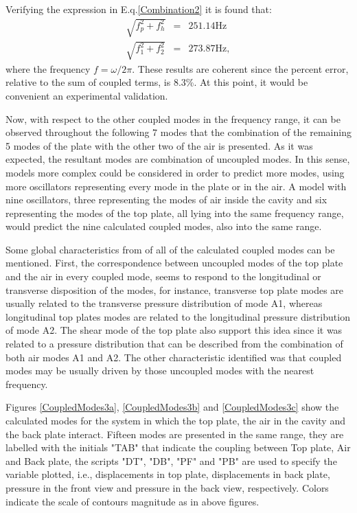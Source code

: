 Verifying the expression in E.q.\ref{Combination2} it is found that:
\begin{eqnarray*}
\sqrt{f_p^2 + f_h^2} & = & 251.14 \text{Hz}\\
\sqrt{f_1^2 + f_2^2} & = & 273.87 \text{Hz},
\end{eqnarray*}
where the frequency $f=\omega / 2 \pi$. These results are coherent since the percent error, relative to the sum of coupled terms, is 8.3\%. At this point, it would be convenient an experimental validation.

Now, with respect to the other coupled modes in the frequency range, it can be observed throughout the following 7 modes that the combination of the remaining 5 modes of the plate with the other two of the air is presented. As it was expected, the resultant modes are combination of uncoupled modes. In this sense, models more complex could be considered in order to predict more modes, using more oscillators representing every mode in the plate or in the air. A model with nine oscillators, three representing the modes of air inside the cavity and six representing the modes of the top plate, all lying into the same frequency range, would predict the nine calculated coupled modes, also into the same range.

Some global characteristics from of all of the calculated coupled modes can be mentioned. First, the correspondence between uncoupled modes of the top plate and the air in every coupled mode, seems to respond to the longitudinal or transverse disposition of the modes, for instance, transverse top plate modes are usually related to the transverse pressure distribution of mode A1, whereas longitudinal top plates modes are related to the longitudinal pressure distribution of mode A2. The shear mode of the top plate also support this idea since it was related to a pressure distribution that can be described from the combination of both air modes A1 and A2. The other characteristic identified was that coupled modes may be usually driven by those uncoupled modes with the nearest frequency.

Figures \ref{CoupledModes3a}, \ref{CoupledModes3b} and \ref{CoupledModes3c} show the calculated modes for the system in which the top plate, the air in the cavity and the back plate interact. Fifteen modes are presented in the same range, they are labelled with the initials "TAB" that indicate the coupling between Top plate, Air and Back plate, the scripts "DT", "DB", "PF" and "PB" are used to specify the variable plotted, i.e., displacements in top plate, displacements in back plate, pressure in the front view and pressure in the back view, respectively. Colors indicate the scale of contours magnitude as in above figures.

